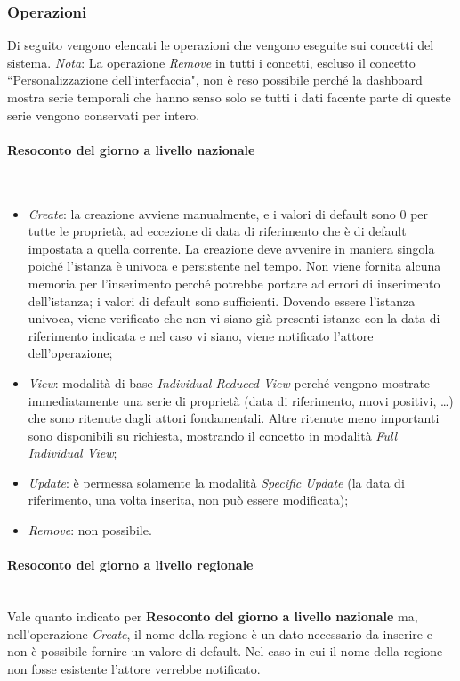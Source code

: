 \subsubsection{Operazioni}
Di seguito vengono elencati le operazioni che vengono eseguite sui concetti del sistema.
\noindent
\textit{Nota}: La operazione \textit{Remove} in tutti i concetti, escluso il concetto ``Personalizzazione dell'interfaccia", non è reso possibile perché la dashboard mostra serie temporali che hanno senso solo se tutti i dati facente parte di queste serie vengono conservati per intero.

\paragraph{Resoconto del giorno a livello nazionale}\mbox{}\\
\begin{itemize}
    \item \textit{Create}: la creazione avviene manualmente, e i valori di default sono 0 per tutte le proprietà, ad eccezione di data di riferimento che è di default impostata a quella corrente.
    La creazione deve avvenire in maniera singola poiché l'istanza è univoca e persistente nel tempo.
    Non viene fornita alcuna memoria per l'inserimento perché potrebbe portare ad errori di inserimento dell'istanza; i valori di default sono sufficienti.
    Dovendo essere l'istanza univoca, viene verificato che non vi siano già presenti istanze con la data di riferimento indicata e nel caso vi siano, viene notificato l'attore dell'operazione;
    \item \textit{View}: modalità di base \textit{Individual Reduced View} perché vengono mostrate immediatamente una serie di proprietà (data di riferimento, nuovi positivi, \dots) che sono ritenute dagli attori fondamentali.
    Altre ritenute meno importanti sono disponibili su richiesta, mostrando il concetto in modalità \textit{Full Individual View};
    \item \textit{Update}: è permessa solamente la modalità \textit{Specific Update} (la data di riferimento, una volta inserita, non può essere modificata);
    \item \textit{Remove}: non possibile.
\end{itemize}

\paragraph{Resoconto del giorno a livello regionale}\mbox{}\\
Vale quanto indicato per \textbf{Resoconto del giorno a livello nazionale} ma, nell'operazione \textit{Create}, il nome della regione è un dato necessario da inserire e non è possibile fornire un valore di default.
Nel caso in cui il nome della regione non fosse esistente l'attore verrebbe notificato.

